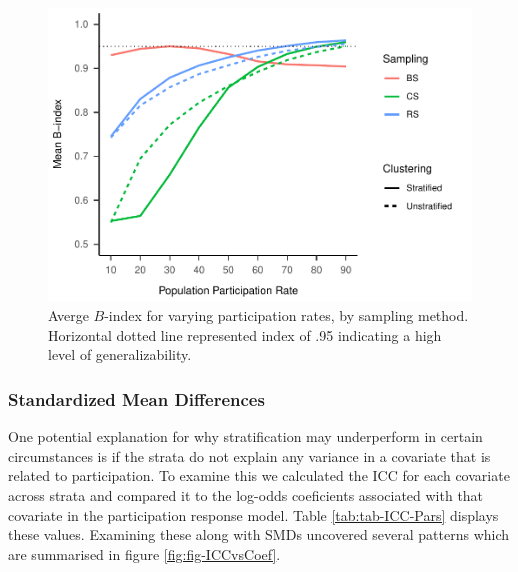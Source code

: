 \documentclass[man,floatsintext]{apa6}
\begin{document}
\begin{figure}
\centering
\includegraphics{GenSamp-Paper_files/figure-latex/fig-avg-Bindex-1.pdf}
\caption{\label{fig:fig-avg-Bindex}Averge \(B\)-index for varying participation rates, by sampling method. Horizontal dotted line represented index of .95 indicating a high level of generalizability.}
\end{figure}

\hypertarget{standardized-mean-differences}{%
\subsubsection{Standardized Mean Differences}\label{standardized-mean-differences}}

One potential explanation for why stratification may underperform in certain circumstances is if the strata do not explain any variance in a covariate that is related to participation. To examine this we calculated the ICC for each covariate across strata and compared it to the log-odds coeficients associated with that covariate in the participation response model. Table \ref{tab:tab-ICC-Pars} displays these values. Examining these along with SMDs uncovered several patterns which are summarised in figure \ref{fig:fig-ICCvsCoef}.
\end{document}
